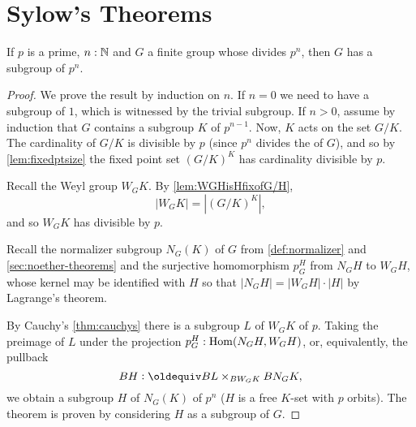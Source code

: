 \section{Sylow's Theorems}
\label{sec:sylow}
\begin{theorem}
  \label{thm:sylow1}
  If $p$ is a prime, $n:\mathbb{N}$ and $G$ a finite group whose \gporder divides $p^n$, then $G$ has a subgroup of \gporder $p^n$.
\end{theorem}
\begin{proof}
  We prove the result by induction on $n$.  
If $n=0$ we need to have a subgroup of \gporder $1$, which is witnessed by the trivial subgroup.
If $n>0$, assume by induction that $G$ contains a subgroup $K$ of \gporder $p^{n-1}$.  
Now, $K$ acts on the set $G/K$.  
The cardinality of $G/K$ is divisible by $p$ (since $p^n$ divides the \gporder of $G$), and so by \cref{lem:fixedptsize} the fixed point set $(G/K)^K$ has cardinality divisible by $p$.  

Recall the Weyl group $W_GK$.
By \cref{lem:WGHisHfixofG/H}, 
$$|W_GK|=|(G/K)^K|,$$
 and so $W_GK$  has \gporder divisible by $p$.  

Recall the normalizer subgroup $N_G(K)$ of $G$ from \cref{def:normalizer} and \cref{sec:noether-theorems} %
and the surjective homomorphism $p_G^H$ from $N_GH$ to $W_GH$, %
whose kernel may be identified with $H$ so that $|N_GH|=|W_GH|\cdot|H|$ by Lagrange's theorem.


By Cauchy's \cref{thm:cauchys} there is a subgroup $L$ of $W_GK$ of \gporder $p$.  
Taking the preimage of $L$ under the projection $p_G^H:\mathrm{Hom}(N_GH,W_GH)$, %
or, equivalently, the pullback
$$BH\defequi BL\times_{BW_GK}BN_GK,$$
we obtain a subgroup $H$ of $N_G(K)$ of \gporder $p^n$ ($H$ is a free $K$-set with $p$ orbits).  The theorem is proven by considering $H$ as a subgroup of $G$.
\end{proof}
